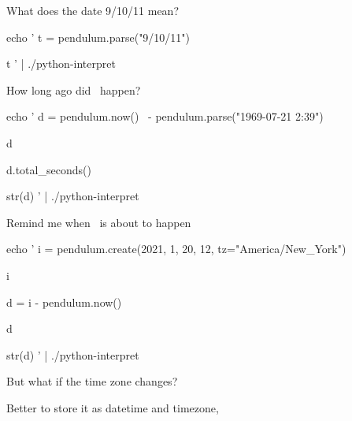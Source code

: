\documentclass[xcolor=svgnames,17pt]{beamer}
\newcommand*{\sizefont}[1]{%
    \ifcase#1\relax
    \or \tiny
    \or \scriptsize
    \or \footnotesize
    \or \small
    \or \normalsize
    \or \large
    \or \Large
    \or \LARGE
    \or \huge
    \or \Huge
    \fi}
\begin{document}
\begin{frame}[fragile]{What does the date 9/10/11 mean?}

{\sizefont{3}
\bash[stdout]
echo '
t = pendulum.parse("9/10/11")


t
' | ./python-interpret
\END
}

\pause



\end{frame}

\begin{frame}[fragile]{How long ago did \fillinblank\ happen?}

{\sizefont{3}
\bash[stdout]
echo '
d = pendulum.now() \
    - pendulum.parse("1969-07-21 2:39")


d


d.total_seconds()


str(d)
' | ./python-interpret
\END
}
\end{frame}

\begin{frame}[fragile]{Remind me when \fillinblank\ is about to happen}

{\sizefont{3}
\bash[stdout]
echo '
i = pendulum.create(2021, 1, 20, 12,
    tz="America/New_York")


i


d = i - pendulum.now() 


d


str(d)
' | ./python-interpret
\END
}

\pause

But what if the time zone changes?

Better to store it as datetime and timezone, 

\end{frame}
\end{document}
